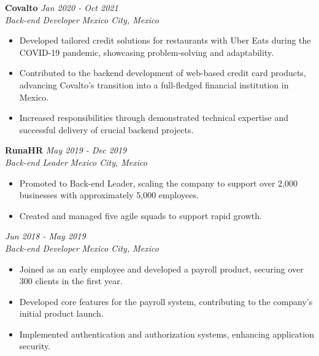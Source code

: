 \documentclass[a4paper,10pt]{article}
\begin{document}
\textbf{Covalto} \hfill \textit{Jan 2020 - Oct 2021} \\
\textit{Back-end Developer} \hfill \textit{Mexico City, Mexico} \\
\begin{itemize}[leftmargin=0.5cm, topsep=0pt, parsep=0pt, itemsep=2pt]
	\item Developed tailored credit solutions for restaurants with Uber Eats
	      during the COVID-19 pandemic, showcasing problem-solving and
	      adaptability.
	\item Contributed to the backend development of web-based credit card
	      products, advancing Covalto’s transition into a full-fledged financial
	      institution in Mexico.
	\item Increased responsibilities through demonstrated technical expertise
	      and successful delivery of crucial backend projects.
\end{itemize}

\textbf{RunaHR} \hfill \textit{May 2019 - Dec 2019} \\
\textit{Back-end Leader} \hfill \textit{Mexico City, Mexico} \\
\begin{itemize}[leftmargin=0.5cm, topsep=0pt, parsep=0pt, itemsep=2pt]
	\item Promoted to Back-end Leader, scaling the company to support over 2,000
	      businesses with approximately 5,000 employees.
	\item Created and managed five agile squads to support rapid growth.
\end{itemize}

\textbf{} \hfill \textit{Jun 2018 - May 2019} \\
\textit{Back-end Developer} \hfill \textit{Mexico City, Mexico} \\
\begin{itemize}[leftmargin=0.5cm, topsep=0pt, parsep=0pt, itemsep=2pt]
	\item Joined as an early employee and developed a payroll product, securing
	      over 300 clients in the first year.
	\item Developed core features for the payroll system, contributing to the
	      company’s initial product launch.
	\item Implemented authentication and authorization systems, enhancing
	      application security.
\end{itemize}
\end{document}
